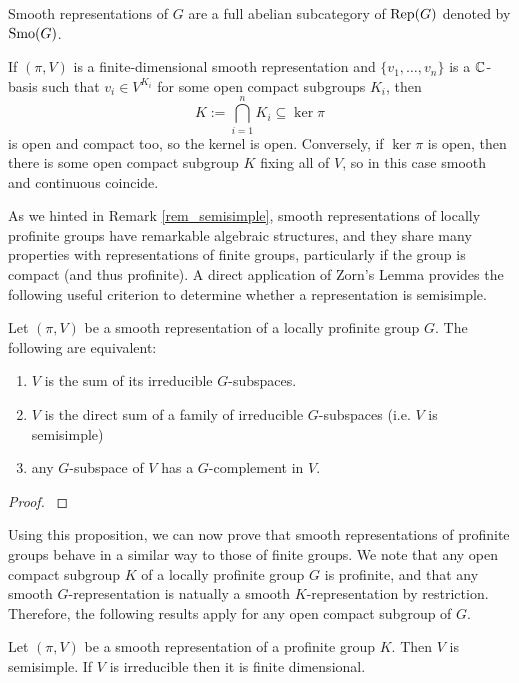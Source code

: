 Smooth representations of $G$ are a full abelian subcategory of $\mathrm{Rep}(G)$ denoted by $\mathrm{Smo}(G)$. 


\begin{rem}\label{rem:contsmooth}
    If $(\pi,V)$ is a finite-dimensional smooth representation and $\{v_1,\ldots,v_n\}$ is a $\mathbb{C}$-basis such that $v_i\in V^{K_i}$ for some open compact subgroups $K_i$, then 
    $$K:=\bigcap_{i=1}^n K_i\subseteq\ker\pi$$
    is open and compact too, so the kernel is open. 
    Conversely, if $\ker\pi$ is open, then there is some open compact subgroup $K$ fixing all of $V$, so in this case smooth and continuous coincide. 
\end{rem}


As we hinted in Remark \ref{rem_semisimple}, smooth representations of locally profinite groups have remarkable algebraic structures, and they share many properties with representations of finite groups, particularly if the group is compact (and thus profinite). A direct application of Zorn's Lemma provides the following useful criterion to determine whether a representation is semisimple. 

\begin{prop}\label{prop_semisimple}
    Let $(\pi,V)$ be a smooth representation of a locally profinite group $G$. The following are equivalent:
    \begin{enumerate}
        \item $V$ is the sum of its irreducible $G$-subspaces.
        \item $V$ is the direct sum of a family of irreducible $G$-subspaces (i.e. $V$ is semisimple)
        \item any $G$-subspace of $V$ has a $G$-complement in $V$.
    \end{enumerate}
\end{prop}

\begin{proof}
    \cite[Lemma 2.2]{BH1}
\end{proof}

Using this proposition, we can now prove that smooth representations of profinite groups behave in a similar way to those of finite groups. We note that any open compact subgroup $K$ of a locally profinite group $G$ is profinite, and that any smooth $G$-representation is natually a smooth $K$-representation by restriction. Therefore, the following results apply for any open compact subgroup of $G$.

\begin{prop}\label{lem_profinite_smooth}
	Let $(\pi,V)$ be a smooth representation of a profinite group $K$. Then $V$ is semisimple. If $V$ is irreducible then it is finite dimensional.
\end{prop}

